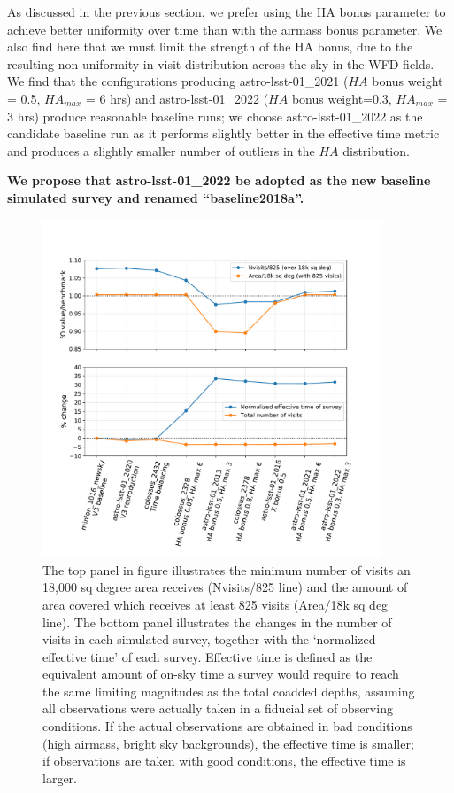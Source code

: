\documentclass[DM,authoryear,toc]{lsstdoc}
\begin{document}
As discussed in the previous section, we prefer using the HA bonus parameter to achieve better uniformity over time than with the airmass bonus parameter. We also find here that we must limit the strength of the HA bonus, due to the resulting non-uniformity in visit distribution across the sky in the WFD fields. We find that the configurations producing astro-lsst-01\_2021 ($HA$ bonus weight = 0.5, $HA_{max}$  = 6 hrs) and astro-lsst-01\_2022 ($HA$ bonus weight=0.3, $HA_{max}$ = 3 hrs) produce reasonable baseline runs; we choose astro-lsst-01\_2022 as the candidate baseline run as it performs slightly better in the effective time metric and produces a slightly smaller number of outliers in the $HA$ distribution. 

\textbf{We propose that astro-lsst-01\_2022 be adopted as the new baseline simulated survey and renamed ``baseline2018a''.}


\begin{figure}[ht]
\centering
\includegraphics[width=0.9\textwidth]{figures/srd}
\caption{The top panel in figure illustrates the minimum number of visits an 18,000 sq degree area receives (Nvisits/825 line) and the amount of area covered which receives at least 825 visits (Area/18k sq deg line).  The bottom panel illustrates the changes in the number of visits in each simulated survey, together with the `normalized effective time' of each survey. Effective time is defined as the equivalent amount of on-sky time a survey would require to reach the same limiting magnitudes as the total coadded depths, assuming all observations were actually taken in a fiducial set of observing conditions. If the actual observations are obtained in bad conditions (high airmass, bright sky backgrounds), the effective time is smaller; if observations are taken with good conditions, the effective time is larger.
\label{fig:srd}}
\end{figure}
\end{document}
